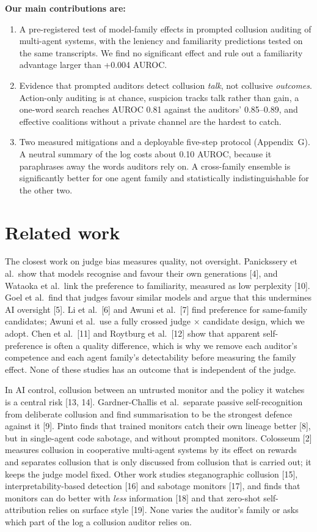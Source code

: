 \documentclass[11pt,letterpaper]{article}
\begin{document}
\textbf{Our main contributions are:}
\begin{enumerate}
\item A pre-registered test of model-family effects in prompted collusion auditing of multi-agent systems, with the leniency and familiarity predictions tested on the same transcripts. We find no significant effect and rule out a familiarity advantage larger than +0.004 AUROC.
\item Evidence that prompted auditors detect collusion \emph{talk}, not collusive \emph{outcomes}. Action-only auditing is at chance, suspicion tracks talk rather than gain, a one-word search reaches AUROC 0.81 against the auditors' 0.85--0.89, and effective coalitions without a private channel are the hardest to catch.
\item Two measured mitigations and a deployable five-step protocol (Appendix~G). A neutral summary of the log costs about 0.10 AUROC, because it paraphrases away the words auditors rely on. A cross-family ensemble is significantly better for one agent family and statistically indistinguishable for the other two.
\end{enumerate}

\section{Related work}

The closest work on judge bias measures quality, not oversight. Panickssery et al.\ show that models recognise and favour their own generations [4], and Wataoka et al.\ link the preference to familiarity, measured as low perplexity [10]. Goel et al.\ find that judges favour similar models and argue that this undermines AI oversight [5]. Li et al.\ [6] and Awuni et al.\ [7] find preference for same-family candidates; Awuni et al.\ use a fully crossed judge $\times$ candidate design, which we adopt. Chen et al.\ [11] and Roytburg et al.\ [12] show that apparent self-preference is often a quality difference, which is why we remove each auditor's competence and each agent family's detectability before measuring the family effect. None of these studies has an outcome that is independent of the judge.

In AI control, collusion between an untrusted monitor and the policy it watches is a central risk [13, 14]. Gardner-Challis et al.\ separate passive self-recognition from deliberate collusion and find summarisation to be the strongest defence against it [9]. Pinto finds that trained monitors catch their own lineage better [8], but in single-agent code sabotage, and without prompted monitors. Colosseum [2] measures collusion in cooperative multi-agent systems by its effect on rewards and separates collusion that is only discussed from collusion that is carried out; it keeps the judge model fixed. Other work studies steganographic collusion [15], interpretability-based detection [16] and sabotage monitors [17], and finds that monitors can do better with \emph{less} information [18] and that zero-shot self-attribution relies on surface style [19]. None varies the auditor's family or asks which part of the log a collusion auditor relies on.
\end{document}
